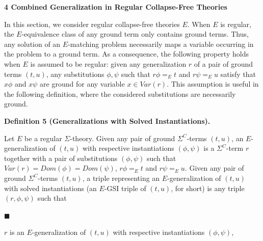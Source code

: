 \documentclass[10pt,a4paper]{amsart}
\begin{document}
 
 
 


 
\par\medskip\noindent\textbf{4 Combined Generalization in Regular Collapse-Free Theories}\par
 
 
In this section, we consider regular collapse-free theories $E$. When $E$ is regular, the $E$-equivalence class of any ground term only contains ground terms. Thus, any solution of an $E$-matching problem necessarily maps a variable occurring in the problem to a ground term. As a consequence, the following property holds when $E$ is assumed to be regular: given any generalization $r$ of a pair of ground terms $(t,u)$, any substitutions $\phi,\psi$ such that $r\phi=_{E}t$ and $r\psi=_{E}u$ satisfy that $x\phi$ and $x\psi$ are ground for any variable $x\in\mathit{Var}(r)$. This assumption is useful in the following definition, where the considered substitutions are necessarily ground.\par
 
 
 
\par\medskip\noindent\textbf{Definition 5 (Generalizations with Solved Instantiations).}\par
 
 
Let $E$ be a regular $\Sigma$-theory. Given any pair of ground ${\Sigma}^{C}$-terms $(t,u)$, an $E$-generalization of $(t,u)$ with respective instantiations $(\phi,\psi)$ is a ${\Sigma}^{C}$-term $r$ together with a pair of substitutions $(\phi,\psi)$ such that $\mathit{Var}(r)=\mathit{Dom}(\phi)=\mathit{Dom}(\psi)$, $r\phi=_{E}t$ and $r\psi=_{E}u$. Given any pair of ground ${\Sigma}^{C}$-terms $(t,u)$, a triple representing an $E$-generalization of $(t,u)$ with solved instantiations (an $E$-GSI triple of $(t,u)$, for short) is any triple $(r,\phi,\psi)$ such that\par
  
\par\noindent  $\blacksquare$ 
 
$r$ is an $E$-generalization of $(t,u)$ with respective instantiations $(\phi,\psi)$,\par
 
\end{document}
